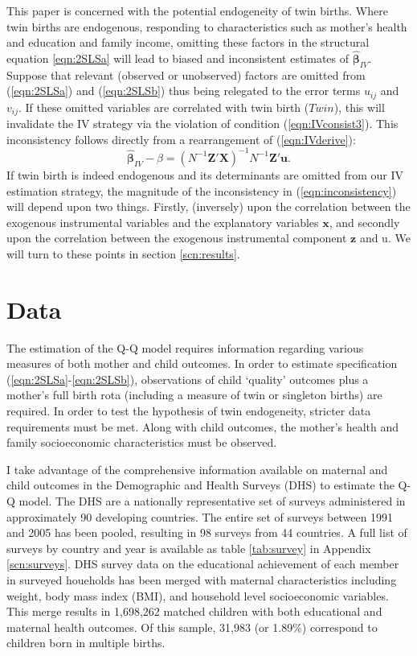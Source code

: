 \documentclass{article}[11pt,subeqn]
\newcommand{\vect}[1]{\mathbf{#1}}
\begin{document}
\begin{spacing}{1.5}
This paper is concerned 
with the potential endogeneity of twin births.  Where twin births are endogenous, responding to characteristics such as mother's 
health and education and family income, omitting these factors in the structural equation \ref{eqn:2SLSa} will lead to biased and 
inconsistent estimates of $\vect{\hat{\beta}}_{IV}$.  Suppose that relevant (observed or unobserved) factors are omitted from
(\ref{eqn:2SLSa}) and (\ref{eqn:2SLSb}) thus being relegated to the error terms $u_{ij}$ and $v_{ij}$.  If these omitted variables 
are correlated with twin birth ($Twin$), this will invalidate the IV strategy via the violation of condition (\ref{eqn:IVconsist3}).  This
inconsistency follows directly from a rearrangement of (\ref{eqn:IVderive}):
\begin{equation}
\label{eqn:inconsistency}
\vect{\hat{\beta}}_{IV}-\beta=(N^{-1}\vect{Z}'\vect{X})^{-1}N^{-1}\vect{Z}'\vect{u}.
\end{equation}
If twin birth is indeed endogenous and its determinants are omitted from our IV estimation strategy, the magnitude of the inconsistency in 
(\ref{eqn:inconsistency}) will depend upon two things.  Firstly, (inversely) upon the correlation between the exogenous instrumental
variables and the explanatory variables $\vect{x}$, and secondly upon the correlation between the exogenous instrumental component
$\vect{z}$ and u.  We will turn to these points in section \ref{scn:results}.

\section{Data}
\label{scn:data}
\vspace{-5mm}
The estimation of the Q-Q model requires information regarding various measures of both mother and child outcomes. In order to estimate 
specification (\ref{eqn:2SLSa}-\ref{eqn:2SLSb}), observations of child `quality' outcomes plus a mother's full birth rota (including a 
measure of twin or singleton births) are required.  In order to test the hypothesis of twin endogeneity, stricter data requirements 
must be met.  Along with child outcomes, the mother's health and family socioeconomic characteristics must be observed.

I take advantage of the comprehensive information available on maternal and child outcomes in the Demographic and Health Surveys (DHS) 
to estimate the Q-Q model.  The DHS are a nationally representative set of surveys administered in approximately 90 developing countries.  
The entire set of surveys between 1991 and 2005 has been pooled, resulting in 98 surveys from 44 countries.  A full list of surveys by 
country and year is available as table \ref{tab:survey} in Appendix \ref{scn:surveys}.  DHS survey data on the educational achievement 
of each member in surveyed houeholds has been merged with maternal characteristics including weight, body mass index (BMI), and 
household level socioeconomic variables.  This merge results in 1,698,262 matched children with both educational and maternal health
outcomes.  Of this sample, 31,983 (or 1.89\%) correspond to children born in multiple births.


\end{spacing}
\end{document}
